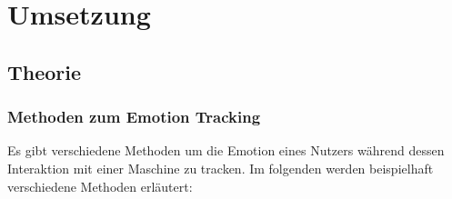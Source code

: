\section{Umsetzung}
\subsection{Theorie}
\subsubsection{Methoden zum Emotion Tracking}
Es gibt verschiedene Methoden um die Emotion eines Nutzers während dessen Interaktion mit einer Maschine zu tracken. Im folgenden werden beispielhaft verschiedene Methoden erläutert:
\begin{itemize}

\end{itemize} 
